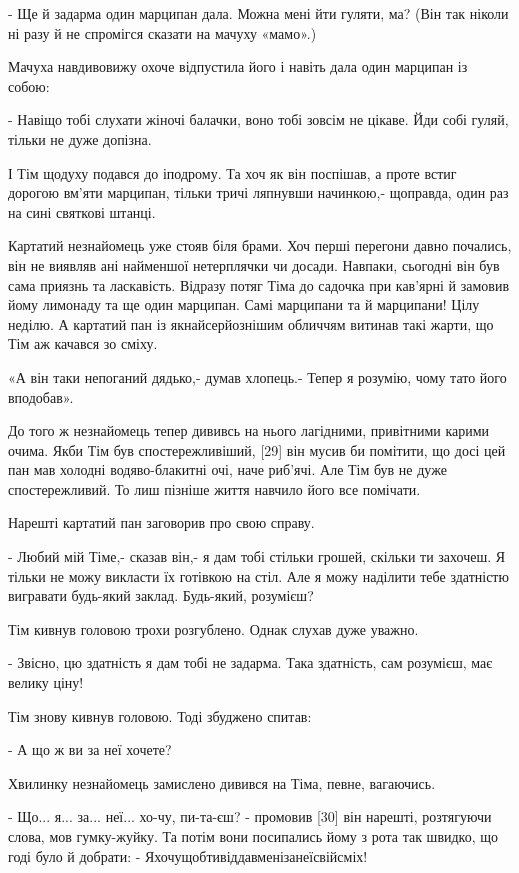 - Ще й задарма один марципан дала. Можна мені йти гуляти, ма? (Він так ніколи ні разу й не спромігся сказати на мачуху «мамо».)

Мачуха навдивовижу охоче відпустила його і навіть дала один марципан із собою:

- Навіщо тобі слухати жіночі балачки, воно тобі зовсім не цікаве. Йди собі гуляй, тільки не дуже допізна.

І Тім щодуху подався до іподрому. Та хоч як він поспішав, а проте встиг дорогою вм'яти марципан, тільки тричі ляпнувши начинкою,- щоправда, один раз на сині святкові штанці.

Картатий незнайомець уже стояв біля брами. Хоч перші перегони давно почались, він не виявляв ані найменшої нетерплячки чи досади. Навпаки, сьогодні він був сама приязнь та ласкавість. Відразу потяг Тіма до садочка при кав'ярні й замовив йому лимонаду та ще один марципан. Самі марципани та й марципани! Цілу неділю. А картатий пан із якнайсерйознішим обличчям витинав такі жарти, що Тім аж качався зо сміху.

«А він таки непоганий дядько,- думав хлопець.- Тепер я розумію, чому тато його вподобав».

До того ж незнайомець тепер дививсь на нього лагідними, привітними карими очима. Якби Тім був спостережливіший, [29] він мусив би помітити, що досі цей пан мав холодні водяво-блакитні очі, наче риб'ячі. Але Тім був не дуже спостережливий. То лиш пізніше життя навчило його все помічати.

Нарешті картатий пан заговорив про свою справу.

- Любий мій Тіме,- сказав він,- я дам тобі стільки грошей, скільки ти захочеш. Я тільки не можу викласти їх готівкою на стіл. Але я можу наділити тебе здатністю вигравати будь-який заклад. Будь-який, розумієш?

Тім кивнув головою трохи розгублено. Однак слухав дуже уважно.

- Звісно, цю здатність я дам тобі не задарма. Така здатність, сам розумієш, має велику ціну!

Тім знову кивнув головою. Тоді збуджено спитав:

- А що ж ви за неї хочете?

Хвилинку незнайомець замислено дивився на Тіма, певне, вагаючись.

- Що... я... за... неї... хо-чу, пи-та-єш? - промовив [30] він нарешті, розтягуючи слова, мов гумку-жуйку. Та потім вони посипались йому з рота так швидко, що годі було й добрати: - Яхочущобтивіддавменізанеїсвійсміх!

